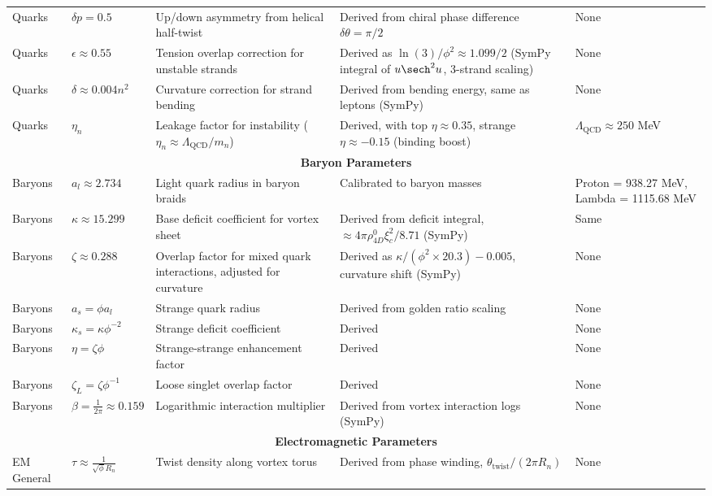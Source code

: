 \begin{sidewaystable}[p]
\begin{tabularx}{\linewidth}{|p{2cm}|p{3cm}|X|X|p{3cm}|}
Quarks & $\delta p = 0.5$ & Up/down asymmetry from helical half-twist & Derived from chiral phase difference $\delta \theta = \pi / 2$ & None \\
Quarks & $\epsilon \approx 0.55$ & Tension overlap correction for unstable strands & Derived as $\ln(3)/\phi^2 \approx 1.099 / 2$ (SymPy integral of $u \sech^2 u$, 3-strand scaling) & None \\
Quarks & $\delta \approx 0.004 n^2$ & Curvature correction for strand bending & Derived from bending energy, same as leptons (SymPy) & None \\
Quarks & $\eta_n$ & Leakage factor for instability ($\eta_n \approx \Lambda_{\text{QCD}} / m_n$) & Derived, with top $\eta \approx 0.35$, strange $\eta \approx -0.15$ (binding boost) & $\Lambda_{\text{QCD}} \approx 250$ MeV \\
\hline
\multicolumn{5}{|c|}{\textbf{Baryon Parameters}} \\
\hline
Baryons & $a_l \approx 2.734$ & Light quark radius in baryon braids & Calibrated to baryon masses & Proton = 938.27 MeV, Lambda = 1115.68 MeV \\
Baryons & $\kappa \approx 15.299$ & Base deficit coefficient for vortex sheet & Derived from deficit integral, $\approx 4 \pi \rho_{4D}^0 \xi_c^2 / 8.71$ (SymPy) & Same \\
Baryons & $\zeta \approx 0.288$ & Overlap factor for mixed quark interactions, adjusted for curvature & Derived as $\kappa / (\phi^2 \times 20.3) - 0.005$, curvature shift (SymPy) & None \\
Baryons & $a_s = \phi a_l$ & Strange quark radius & Derived from golden ratio scaling & None \\
Baryons & $\kappa_s = \kappa \phi^{-2}$ & Strange deficit coefficient & Derived & None \\
Baryons & $\eta = \zeta \phi$ & Strange-strange enhancement factor & Derived & None \\
Baryons & $\zeta_L = \zeta \phi^{-1}$ & Loose singlet overlap factor & Derived & None \\
Baryons & $\beta = \frac{1}{2\pi} \approx 0.159$ & Logarithmic interaction multiplier & Derived from vortex interaction logs (SymPy) & None \\
\hline
\multicolumn{5}{|c|}{\textbf{Electromagnetic Parameters}} \\
\hline
EM General & $\tau \approx \frac{1}{\sqrt{\phi} R_n}$ & Twist density along vortex torus & Derived from phase winding, $\theta_{\text{twist}} / (2\pi R_n)$ & None \\

\end{tabularx}
\end{sidewaystable}
